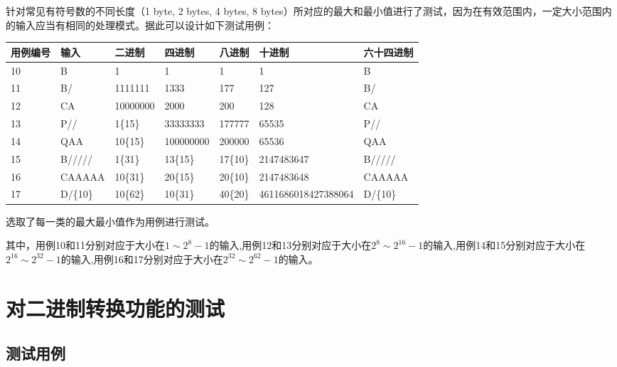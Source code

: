 \documentclass[12pt, a4paper, oneside]{ctexart}
\begin{document}
针对常见有符号数的不同长度（1 byte, 2 bytes, 4 bytes, 8 bytes）所对应的最大和最小值进行了测试，因为在有效范围内，一定大小范围内的输入应当有相同的处理模式。据此可以设计如下测试用例：

\begin{table}[!h]
    \small
    \begin{tabular}{|l|l|l|l|l|l|l|}
    \hline
    用例编号 & 输入 & 二进制 & 四进制 & 八进制 & 十进制 & 六十四进制\\ \hline
    10 & B & 1 & 1 & 1 & 1 & B \\ \hline
    11 & B/ & 1111111 & 1333 & 177 & 127 & B/ \\ \hline
    12 & CA & 10000000 & 2000 & 200 & 128 & CA \\ \hline
    13 & P// & 1\{15\} & 33333333 & 177777 & 65535 & P// \\ \hline
    14 & QAA & 10\{15\} & 100000000 & 200000 & 65536 & QAA \\ \hline
    15 & B///// & 1\{31\} & 13\{15\} & 17\{10\} & 2147483647 & B/////\\ \hline
    16 & CAAAAA & 10\{31\} & 20\{15\} & 20\{10\} & 2147483648 & CAAAAA \\ \hline
    17 & D/\{10\} & 10\{62\} & 10\{31\} & 40\{20\} & 4611686018427388064 & D/\{10\} \\ \hline
    \end{tabular}
\end{table}
选取了每一类的最大最小值作为用例进行测试。

其中，用例10和11分别对应于大小在$1\sim2^{8}-1$的输入,用例12和13分别对应于大小在$2^{8}\sim2^{16}-1$的输入,用例14和15分别对应于大小在$2^{16}\sim2^{32}-1$的输入,用例16和17分别对应于大小在$2^{32}\sim2^{62}-1$的输入。

\newpage
\section{对二进制转换功能的测试}

\subsection{测试用例}
\end{document}
